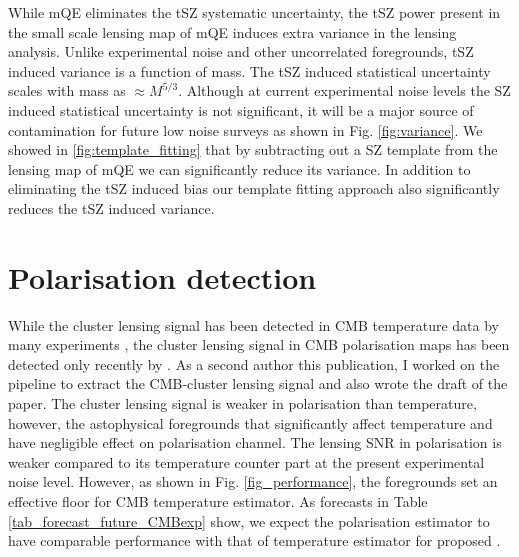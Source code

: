  While mQE eliminates the tSZ systematic uncertainty, the tSZ power present in the small scale lensing map of mQE induces extra variance in the lensing analysis. 
 Unlike experimental noise and other uncorrelated foregrounds, tSZ induced variance is a function of mass. 
The tSZ induced statistical uncertainty scales with mass as $\approx M^{5/3}$. 
 Although at current experimental noise levels the SZ induced statistical uncertainty is not significant, it will be a major source of contamination for future low noise surveys as shown in Fig. \ref{fig:variance}. We showed in \ref{fig:template_fitting} that by subtracting out a SZ template from the lensing map of mQE we can significantly reduce its variance. In addition to eliminating the tSZ induced bias our template fitting approach also significantly reduces the tSZ induced variance. 

 \section{Polarisation detection}
 \label{pol_detection}
 While the cluster lensing signal has been detected in CMB temperature data by many experiments \citep{baxter15, raghunathan18,geach17, baxter18}, the cluster lensing signal in CMB polarisation maps has been detected only recently by \citet{raghunathan19}. As a second author this publication, I worked on the pipeline to extract the CMB-cluster lensing signal and also wrote the draft of the paper.   
 The cluster lensing signal is weaker in polarisation than temperature, however, the astophysical foregrounds that significantly affect temperature and have negligible effect on polarisation channel.
  The lensing SNR in polarisation is weaker compared to its temperature counter part at the present experimental noise level. However, as shown in Fig. \ref{fig_performance}, the foregrounds set an effective floor for CMB temperature estimator. %
  As forecasts in Table \ref{tab_forecast_future_CMBexp} show, we expect the polarisation estimator to have comparable performance with that of temperature estimator for proposed \citet{cmbs4-sb1}.
 

